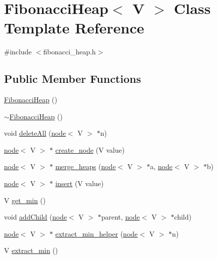 \hypertarget{class_fibonacci_heap}{}\section{Fibonacci\+Heap$<$ V $>$ Class Template Reference}
\label{class_fibonacci_heap}


{\ttfamily \#include $<$fibonacci\+\_\+heap.\+h$>$}

\subsection*{Public Member Functions}
\begin{DoxyCompactItemize}
\item 
\hyperlink{class_fibonacci_heap_ab59b6ac11eaf6f956b4e3db7d8c3c472}{Fibonacci\+Heap} ()
\item 
\hyperlink{class_fibonacci_heap_a106b353a0c16a47d28916cac8b2370a0}{$\sim$\+Fibonacci\+Heap} ()
\item 
void \hyperlink{class_fibonacci_heap_a2726ce00ae9e20ef8bd88a1bf2f41313}{delete\+All} (\hyperlink{structnode}{node}$<$ V $>$ $\ast$n)
\item 
\hyperlink{structnode}{node}$<$ V $>$ $\ast$ \hyperlink{class_fibonacci_heap_a2de69d27315f0f4cd6c2375a485c6ef5}{create\+\_\+node} (V value)
\item 
\hyperlink{structnode}{node}$<$ V $>$ $\ast$ \hyperlink{class_fibonacci_heap_a131874fb70c0ed4b2a09b94afa71ed6a}{merge\+\_\+heaps} (\hyperlink{structnode}{node}$<$ V $>$ $\ast$a, \hyperlink{structnode}{node}$<$ V $>$ $\ast$b)
\item 
\hyperlink{structnode}{node}$<$ V $>$ $\ast$ \hyperlink{class_fibonacci_heap_a0f46f3062277aecb53bfbaa92d35a765}{insert} (V value)
\item 
V \hyperlink{class_fibonacci_heap_a63cc52318444c719a45f75a3b0698d31}{get\+\_\+min} ()
\item 
void \hyperlink{class_fibonacci_heap_aa9ad54a64b54264ec3dd435a4190af16}{add\+Child} (\hyperlink{structnode}{node}$<$ V $>$ $\ast$parent, \hyperlink{structnode}{node}$<$ V $>$ $\ast$child)
\item 
\hyperlink{structnode}{node}$<$ V $>$ $\ast$ \hyperlink{class_fibonacci_heap_a0ce9ea86a726ae81bcd8935bff6dc954}{extract\+\_\+min\+\_\+helper} (\hyperlink{structnode}{node}$<$ V $>$ $\ast$n)
\item 
V \hyperlink{class_fibonacci_heap_ad483e2607e101d410781fb52bb3099ac}{extract\+\_\+min} ()
\item 

\end{DoxyCompactItemize}
